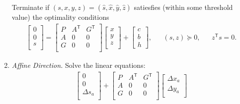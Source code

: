 \begin{enumerate}
    Terminate if $(s,x,y,z)=(\hat s,\hat x,\hat y,\hat z)$ satiesfies (within some threshold value) the optimality conditions
    \begin{equation*}
    	\begin{aligned}
    		\begin{bmatrix}
    			0\\
    			0\\
    			s\\
    		\end{bmatrix}
    		=
    		\begin{bmatrix}
        		P & A^\mathsf{T} & G^\mathsf{T}\\
        		A & 0 & 0\\
        		G & 0 & 0\\
    		\end{bmatrix}
    		\begin{bmatrix}
    			x\\
    			y\\
    			z\\
    		\end{bmatrix}
    		+
    		\begin{bmatrix}
    			c\\
    			b\\
    			h
    		\end{bmatrix}
    		,
    		& & (s,z) \succeq0, & &  z^\mathsf{T}s=0.
    	\end{aligned}	
    \end{equation*}
    \item \textit{Affine Direction.} Solve the linear equations:\\
    \begin{equation}
    	\begin{aligned}
			\begin{bmatrix}
    			0\\
    			0\\
    			\Delta s_a\\
    		\end{bmatrix}
    		+
    		\begin{bmatrix}
        		P & A^\mathsf{T} & G^\mathsf{T}\\
        		A & 0 & 0\\
        		G & 0 & 0\\
    		\end{bmatrix}
    		\begin{bmatrix}
    			\Delta x_a\\
    			\Delta y_a\\

\end{bmatrix}
\end{aligned}
\end{equation}
\end{enumerate}
